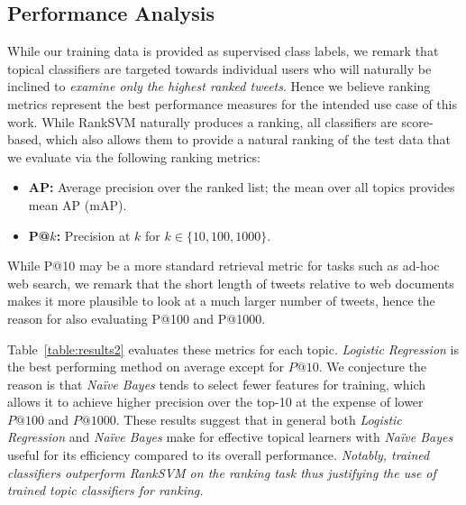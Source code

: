 \subsection{Performance Analysis}

While our training data
is provided as supervised class labels, we remark that topical classifiers
are targeted towards individual users who will naturally be inclined 
to \emph{examine only the highest ranked tweets}.  Hence we believe ranking
metrics represent the best performance measures for the intended use case of this work.
While RankSVM naturally produces a ranking, all classifiers are score-based, which also allows
them to provide a natural ranking of the test data that we evaluate via the following
ranking metrics:
\begin{itemize}
\item {\bf AP:} Average precision over the ranked list; the mean over
all topics provides mean AP (mAP).
\item {\bf P@$k$:} Precision at $k$ for $k \in \{ 10, 100, 1000 \}$.
\end{itemize}
While P@10 may be a more standard retrieval metric for tasks such
as ad-hoc web search, we remark that the short length of tweets relative
to web documents makes it more plausible to look at a much larger number
of tweets, hence the reason for also evaluating P@100 and P@1000.

%
Table~\ref{table:results2} evaluates these metrics for each
topic. \textit{Logistic Regression} is the best performing
method on average except for $P@10$.  We conjecture the reason
is that \textit{Na\"{i}ve Bayes} tends to select fewer
features for training, which allows it to achieve higher precision
over the top-10 at the expense of lower $P@100$ and $P@1000$.
These results suggest that in general both \textit{Logistic Regression}
and \textit{Na\"{i}ve Bayes} make for effective topical 
learners with \textit{Na\"{i}ve Bayes} useful for 
its efficiency compared to its overall performance.  \emph{Notably,
trained classifiers outperform RankSVM on the ranking task thus justifying
the use of trained topic classifiers for ranking.}


